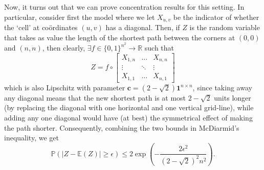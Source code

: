 	Now, it turns out that we can prove concentration results for this setting. In 
	particular, consider first the model where we let $X_{u,v}$ be the indicator of 
	whether the `cell' at co\"ordinates $(u,v)$ has a diagonal. Then, if $Z$ is the 
	random variable that takes as value the length of the shortest path between the 
	corners at $(0,0)$ and $(n,n)$, then clearly, $\exists f \in \{0,1\}^{n^2} 
	\rightarrow \mathbb{R}$ such that 
	$$
		Z = f \circ 
		\begin{bmatrix}
			X_{1,n} & \hdots & X_{n,n} \\
			\vdots & \ddots & \vdots \\
			X_{1,1} &\hdots & X_{n,1}
		\end{bmatrix}
	$$
	which is also Lipschitz with parameter $\mathbf{c} = (2-\sqrt 2) \mathbf{1}^{n\times n}$, 
	since taking away any diagonal means that the new shortest path is at most $2-\sqrt 2$ 
	units longer (by replacing the diagonal with one horizontal and one vertical grid-line),
	while adding any one diagonal would have (at best) the symmetrical effect of making the 
	path shorter. Consequently, combining the two bounds in McDiarmid's inequality, we get 
	$$
		\mathbb{P}(|Z-\mathbb{E}(Z)| \geq \epsilon) \leq 
		2 \exp \left(-\frac{2\epsilon^2}{(2-\sqrt 2)^2 n^2}\right).
	$$


